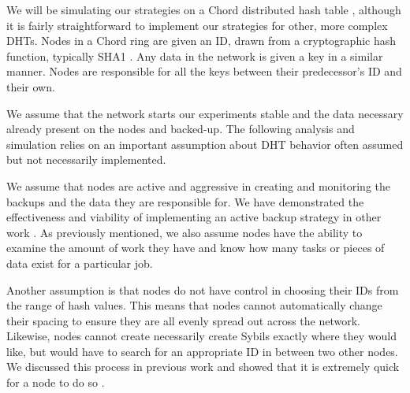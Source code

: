We will be simulating our strategies on a Chord distributed hash table \cite{chord}, although it is fairly straightforward to implement our strategies for other, more complex DHTs.
Nodes in a Chord ring are given an ID, drawn from a cryptographic hash function, typically SHA1 \cite{sha1}.
Any data in the network is given a key in a similar manner.
Nodes are responsible for all the keys between their predecessor's ID and their own.

We assume that the network starts our experiments stable and the data necessary already present on the nodes and backed-up.
The following analysis and simulation relies on an important assumption about DHT behavior often assumed but not necessarily implemented.


We assume that nodes are active and aggressive in creating and monitoring the backups and the data they are responsible for.
We have demonstrated the effectiveness and viability of implementing an active backup strategy in other work \cite{chordreduce} \cite{urdht}.
As previously mentioned, we also assume nodes have the ability to examine the amount of work they have and know how many tasks or pieces of data exist for a particular job.

Another assumption is that nodes do not have control in choosing their IDs from the range of hash values.
This means that nodes cannot automatically change their spacing to ensure they are all evenly spread out across the network.
Likewise, nodes cannot create necessarily create Sybils exactly where they would like, but would have to search for an appropriate ID in between two other nodes.
We discussed this process in previous work and showed that it is extremely quick for a node to do so \cite{sybil-analysis}.





%
%
%


